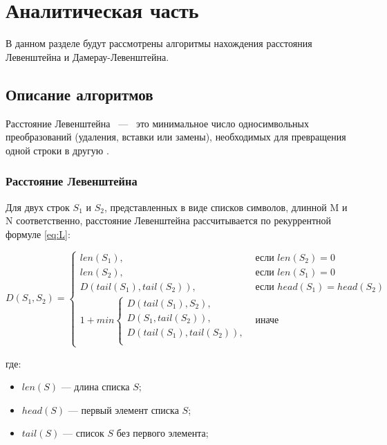 \chapter{Аналитическая часть}

В данном разделе будут рассмотрены алгоритмы нахождения расстояния Левенштейна
и Дамерау-Левенштейна.

\section{Описание алгоритмов}

Расстояние Левенштейна ~---~ это минимальное число односимвольных преобразований
(удаления, вставки или замены), необходимых для превращения одной строки в другую \cite{bib0}.

\subsection{Расстояние Левенштейна}

Для двух строк $S_{1}$ и $S_{2}$, представленных в виде списков символов, длинной M и N соответственно, расстояние Левенштейна рассчитывается по рекуррентной формуле \ref{eq:L}:

\begin{equation}
	\label{eq:L}
	D(S_{1}, S_{2}) = \begin{cases}
	len(S_{1}), &\text{если $len(S_{2})=0$}\\
	len(S_{2}), &\text{если $len(S_{1})=0$}\\
	D(tail(S_{1}), tail(S_{2})), &\text{если $head(S_{1})=head(S_{2})$}\\
	1 + min \begin{cases}
		D(tail(S_{1}), S_{2}),\\
		D(S_{1}, tail(S_{2})),\\
		D(tail(S_{1}), tail(S_{2})),\\
	\end{cases}
	&\text{иначе}
	\end{cases}
\end{equation}

\vspace{5mm}

где:
\begin{itemize}
	\item $len(S)$ — длина списка $S$;
	\item $head(S)$ — первый элемент списка $S$;
	\item $tail(S)$ — список $S$ без первого элемента;
\end{itemize}

